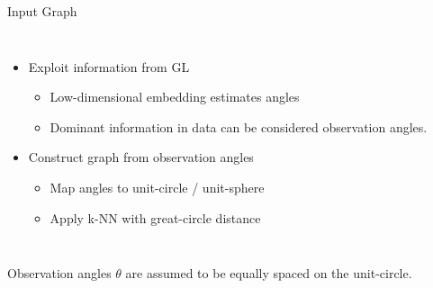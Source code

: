 \begin{frame}{Input Graph}
  \pause
  \begin{columns}
    \begin{itemize}
      \item Exploit information from GL
      \begin{itemize}
        \item Low-dimensional embedding estimates angles
        \item Dominant information in data can be considered observation angles.
      \end{itemize}
      \item<3-> \alert<3>{Construct graph from observation angles}
      \begin{itemize}
        \item<4-> \alert<4>{Map angles to unit-circle / unit-sphere}
        \item<5-> \alert<5>{Apply k-NN with great-circle distance}
      \end{itemize}
    \end{itemize}


    
  \end{columns}
  

  \begin{tcolorbox}[colback=red!5!white,hide=<1-5>, alert=<6>, colframe=red!75!black]
    Observation angles $\theta$ are assumed to be equally spaced on the unit-circle.
\end{tcolorbox}
\end{frame}

